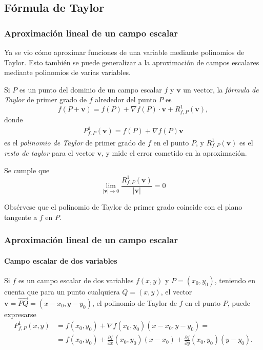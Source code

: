 \subsection{Fórmula de Taylor}
\begin{frame}
\frametitle{Aproximación lineal de un campo escalar}
Ya se vio cómo aproximar funciones de una variable mediante polinomios de Taylor. 
Esto también se puede generalizar a la aproximación de campos escalares mediante polinomios de varias variables. 

Si $P$ es un punto del dominio de un campo escalar $f$ y $\mathbf{v}$ un vector, la \emph{fórmula de Taylor} de primer grado de $f$ alrededor del punto $P$ es
\[
f(P+\mathbf{v}) = f(P) + \nabla f(P)\cdot \mathbf{v} +R^1_{f,P}(\mathbf{v}),
\]
donde 
\begin{align*}
P^1_{f,P}(\mathbf{v}) = f(P)+\nabla f(P)\mathbf{v}
\end{align*}
es el \emph{polinomio de Taylor} de primer grado de $f$ en el punto $P$, y $R^1_{f,P}(\mathbf{v})$ es el \emph{resto de taylor} para el vector $\mathbf{v}$, y mide el error cometido en la aproximación.

Se cumple que  
\[
\lim_{|\mathbf{v}|\rightarrow 0} \frac{R^1_{f,P}(\mathbf{v})}{|\mathbf{v}|} = 0
\]

Obsérvese que el polinomio de Taylor de primer grado coincide con el plano tangente a $f$ en $P$.
\end{frame}


\begin{frame}
\frametitle{Aproximación lineal de un campo escalar}
\framesubtitle{Campo escalar de dos variables}
Si $f$ es un campo escalar de dos variables $f(x,y)$ y $P=(x_0,y_0)$, teniendo en cuenta que para un punto cualquiera $Q=(x,y)$, el vector $\mathbf{v}=\vec{PQ}=(x-x_0,y-y_0)$, el polinomio de Taylor de $f$
en el punto $P$, puede expresarse
\begin{align*}
P^1_{f,P}(x,y) &= f(x_0,y_0)+\nabla f(x_0,y_0)(x-x_0,y-y_0) =\\
&= f(x_0,y_0)+\frac{\partial f}{\partial x}(x_0,y_0)(x-x_0)+\frac{\partial f}{\partial y}(x_0,y_0)(y-y_0).
\end{align*}
\end{frame}


